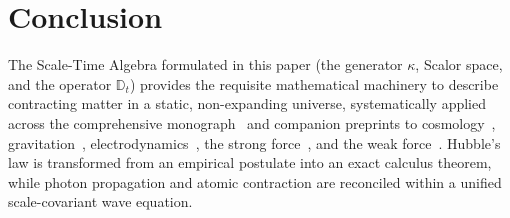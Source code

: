 \documentclass[11pt,a4paper]{article}
\begin{document}
\section{Conclusion}
\label{sec:sonuc}

The Scale-Time Algebra formulated in this paper (the generator $\kappa$, Scalor space, and the operator $\mathbb{D}_t$) provides the requisite mathematical machinery to describe contracting matter in a static, non-expanding universe, systematically applied across the comprehensive monograph~\cite{main_paper} and companion preprints to cosmology~\cite{paper1}, gravitation~\cite{paper4}, electrodynamics~\cite{paper5}, the strong force~\cite{paper6}, and the weak force~\cite{paper7}. Hubble's law is transformed from an empirical postulate into an exact calculus theorem, while photon propagation and atomic contraction are reconciled within a unified scale-covariant wave equation.
\end{document}
